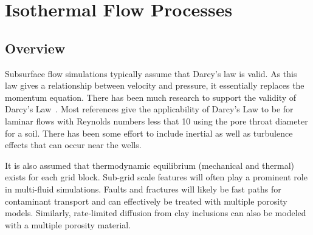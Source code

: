 %
%

\def\bnabla{{\boldsymbol{\nabla}}}
\def\bg{{\boldsymbol{g}}}
\def\bq{{\boldsymbol{q}}}
\def\bx{{\boldsymbol{x}}}
\def\bJ{{\boldsymbol{J}}}
\def\K{{\mathbb K}}

\def\Frac{\displaystyle \frac}

\def\ucdot{{\,\cdot\,}}
\def\ukg{{\rm kg}}
\def\um{{\rm m}}
\def\us{{\rm s}}
\def\umol{{\rm mol}}
\def\upa{{\rm Pa}}

\section{Isothermal Flow Processes}         
\label{sec:flow-processes}

\subsection{Overview}

Subsurface flow simulations typically assume that Darcy's law is valid. 
As this law gives a relationship between velocity and pressure,
it essentially replaces the momentum equation. 
There has been much research to support the validity of Darcy's
Law~\citep{bear-1972}.
Most references give the applicability of Darcy's Law to be 
for laminar flows with Reynolds numbers less that 10 using the pore throat diameter for a soil.
There has been some effort to include inertial as well as turbulence effects that can occur near the wells.

It is also assumed that thermodynamic equilibrium (mechanical and thermal) exists for each grid block.  
Sub-grid scale features will often play a prominent role in multi-fluid simulations. 
Faults and fractures will likely be fast paths for contaminant transport and can
effectively be treated with multiple porosity models. 
Similarly, rate-limited diffusion from clay inclusions can also be modeled with a
multiple porosity material.

